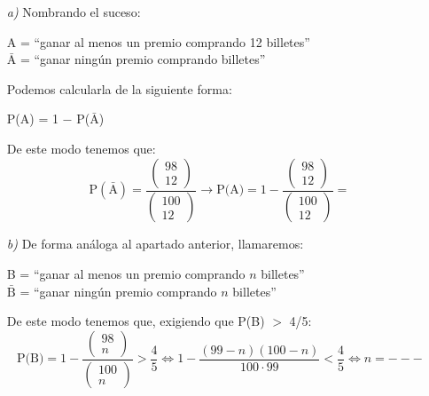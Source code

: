 \documentclass[11pt,a4paper]{article}
\theoremstyle{definition}
\begin{document}
	\begin{itemize}
		\item[\emph{a)}] Nombrando el suceso:
		\item[] \hspace*{1cm}A = ``ganar al menos un premio comprando 12 billetes''\\
		\hspace*{1cm}$\bar{\text{A}}$ = ``ganar ningún premio comprando billetes''
		\item[] Podemos calcularla de la siguiente forma:
		\item[] \hspace*{1cm}P(A) = 1 $-$ P($\bar{\text{A}}$)
		\item[] De este modo tenemos que:
		$$\text{P}(\bar{\text{A}}) = \frac{\left(\begin{matrix}98 \\ 12\end{matrix}\right)}{\left(\begin{matrix}100 \\ 12\end{matrix}\right)} \rightarrow \text{P(A)} = 1 - \frac{\left(\begin{matrix}98 \\ 12\end{matrix}\right)}{\left(\begin{matrix}100 \\ 12\end{matrix}\right)} = $$
		\item[\emph{b)}] De forma análoga al apartado anterior, llamaremos:
		\item[] \hspace*{1cm}B = ``ganar al menos un premio comprando $n$ billetes''\\
		\hspace*{1cm}$\bar{\text{B}}$ = ``ganar ningún premio comprando $n$ billetes''
		\item[] De este modo tenemos que, exigiendo que P(B) $>$ 4/5:
		$$\text{P(B)} = 1 - \frac{\left(\begin{matrix}98 \\ n\end{matrix}\right)}{\left(\begin{matrix}100 \\ n\end{matrix}\right)} > \frac{4}{5} \iff 1 - \frac{(99-n)(100-n)}{100 \cdot 99} < \frac{4}{5} \iff n = --- $$
	\end{itemize}
\end{document}
